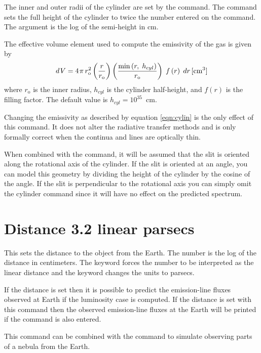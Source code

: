 The inner and outer radii of the cylinder are set by
the  command.
The  command sets the full height of
the cylinder to twice the number entered on the command.
The argument is
the log of the semi-height in cm.

The effective volume element used to compute the emissivity of the gas
is given by
\begin{equation}
\label{eqn:cylin}
d{\kern 1pt} V = 4{\kern 1pt} \pi \,r_{\mathrm{o}}^2 \left( {\frac{r}{{r_{\mathrm{o}}
}}} \right)\left( {\frac{{\min \left( {r,\;h_{cyl} } \right)}}{{r_{\mathrm{o}}
}}} \right)\;f\left( r \right)\;dr
\,[\mathrm{cm}^{3}]%
\end{equation}
where $r_{\mathrm{o}}$ is the inner radius, $h_{cyl}$ is the cylinder
half-height, and $f(r)$
is the filling factor.
The default value is $h_{cyl}= 10^{35}$~cm.

Changing the emissivity as described by equation \ref{eqn:cylin}
is the only effect of this command.
It does not alter the radiative transfer methods and is
only formally correct when the continua and lines are optically thin.

When combined with the  command, it will be assumed
that the slit is oriented along the rotational axis of the cylinder. If the
slit is oriented at an angle, you can model this geometry by dividing the
height of the cylinder by the cosine of the angle. If the slit is
perpendicular to the rotational axis you can simply omit the cylinder command
since it will have no effect on the predicted spectrum.

\section{Distance 3.2 linear parsecs}

This sets the distance to the object from the Earth.
The number is the
log of the distance in centimeters.
The  keyword forces the number
to be interpreted as the linear distance and the
 keyword changes
the units to parsecs.

If the distance is set then it is possible to predict the emission-line
fluxes observed at Earth if the luminosity case is
computed.
If the distance is set with this command then the observed
emission-line fluxes at the Earth will be printed if the
command is also entered.

This command can be combined with the  command
to simulate observing parts of a nebula from the Earth.

